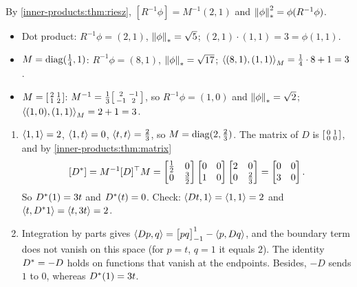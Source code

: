 By \cref{inner-products:thm:riesz}, $[R^{-1}\phi] = M^{-1}(2, 1)$ and
$\left\|\phi\right\|_*^2 = \phi(R^{-1}\phi)$.
\begin{itemize}[nosep]
  \item Dot product: $R^{-1}\phi = (2, 1)$, $\left\|\phi\right\|_* = \sqrt5$;
        $(2, 1)\cdot(1, 1) = 3 = \phi(1, 1)$.
  \item $M = \operatorname{diag}(\frac14, 1)$: $R^{-1}\phi = (8, 1)$,
        $\left\|\phi\right\|_* = \sqrt{17}$;
        $\left\langle (8, 1), (1, 1) \right\rangle_M = \frac14\cdot8 + 1 = 3$.
  \item $M = \begin{bsmallmatrix}2 & 1\\1 & 2\end{bsmallmatrix}$:
        $M^{-1} = \frac13\begin{bsmallmatrix}2 & -1\\-1 & 2
        \end{bsmallmatrix}$, so $R^{-1}\phi = (1, 0)$ and
        $\left\|\phi\right\|_* = \sqrt2$;
        $\left\langle (1, 0), (1, 1) \right\rangle_M = 2 + 1 = 3$.
\end{itemize}

\begin{enumerate}[nosep]
  \item $\left\langle 1, 1 \right\rangle = 2$, $\left\langle 1, t \right\rangle = 0$, $\left\langle t, t \right\rangle = \frac23$, so
        $M = \operatorname{diag}(2, \frac23)$. The matrix of $D$ is
        $\begin{bsmallmatrix}0 & 1\\0 & 0\end{bsmallmatrix}$, and by
        \cref{inner-products:thm:matrix}
        \[
          [D^{*}] = M^{-1}[D]^\top M
          = \begin{bmatrix}\frac12 & 0\\0 & \frac32\end{bmatrix}
            \begin{bmatrix}0 & 0\\1 & 0\end{bmatrix}
            \begin{bmatrix}2 & 0\\0 & \frac23\end{bmatrix}
          = \begin{bmatrix}0 & 0\\3 & 0\end{bmatrix} .
        \]
        So $D^{*}(1) = 3t$ and $D^{*}(t) = 0$. Check:
        $\left\langle Dt, 1 \right\rangle = \left\langle 1, 1 \right\rangle = 2$ and
        $\left\langle t, D^{*}1 \right\rangle = \left\langle t, 3t \right\rangle = 2$.
  \item Integration by parts gives
        $\left\langle Dp, q \right\rangle = \bigl[pq\bigr]_{-1}^1 - \left\langle p, Dq \right\rangle$, and the
        boundary term does not vanish on this space (for $p = t$, $q = 1$
        it equals $2$). The identity $D^{*} = -D$ holds on functions that
        vanish at the endpoints. Besides, $-D$ sends $1$ to $0$, whereas
        $D^{*}(1) = 3t$.
\end{enumerate}

